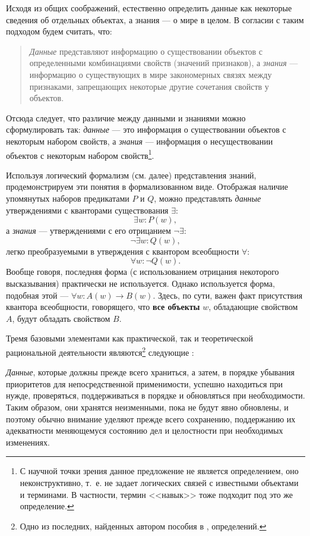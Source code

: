 \documentclass[12pt, openany, twoside]{book} %
\begin{document}
Исходя из общих соображений, естественно определить данные как некоторые сведения об отдельных объектах, а знания --- о мире в целом. В согласии с таким подходом будем считать, что:
\begin{quote}
{\em Данные} представляют информацию о существовании объектов с определенными комбинациями свойств\linebreak{} (значений признаков), а {\em знания} --- информацию о существующих в мире закономерных связях между признаками, запрещающих некоторые другие сочетания свойств у объектов.
\end{quote}

Отсюда следует, что различие между данными и знаниями можно сфор\-му\-ли\-ро\-вать так: {\em данные} --- это информация о существовании объектов с некоторым набором свойств, а {\em знания} --- информация о несуществовании объектов с некоторым набором свойств\footnote{С научной точки зрения данное предложение не является определением, оно неконструктивно, т.~е. не задает логических связей с известными объектами и терминами. В частности, термин <<навык>> тоже подходит под это же определение.}.

Используя логический формализм (см. далее) представления знаний, продемонстрируем эти понятия в формализованном виде. Отображая наличие упомянутых наборов предикатами $P$ и $Q$, можно представлять {\em данные} утверждениями с кванторами существования
$\exists$:
$$
    \exists w: P(w),
$$
а {\em знания} --- утверждениями с его отрицанием $\neg\exists$:
$$
    \neg\exists w: Q(w),
$$
легко преобразуемыми в утверждения с квантором всеобщности
$\forall$:
$$
    \forall w: \neg Q(w).
$$
Вообще говоря, последняя форма (с использованием отрицания некоторого высказывания) практически не используется. Однако используется форма, подобная этой --- $\forall w: A(w)\to B(w)$. Здесь, по сути, важен факт присутствия квантора всеобщности, говорящего, что {\bf все объекты} $w$, обладающие свойством $A$, будут обладать свойством $B$.

Тремя базовыми элементами как практической, так и теоретической рациональной деятельности являются\footnote{Одно из последних, найденных автором пособия в \cite{DDWII}, определений.} следующие \cite{DDWII}:

    {\em Данные}, которые должны прежде всего храниться, а затем, в порядке убывания приоритетов для непосредственной применимости, успешно находиться при нужде, проверяться, поддерживаться в порядке и обновляться при необходимости. Таким образом, они хранятся неизменными, пока не будут явно обновлены, и поэтому обычно внимание уделяют прежде всего сохранению, поддержанию их адекватности меняющемуся состоянию дел и целостности при необходимых изменениях.
\end{document}

